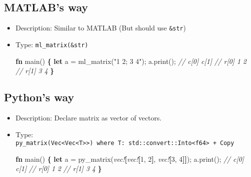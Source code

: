 \documentclass[]{book}
\newenvironment{Shaded}{\begin{snugshade}}{\end{snugshade}}
\newcommand{\CommentTok}[1]{\textcolor[rgb]{0.56,0.35,0.01}{\textit{#1}}}
\newcommand{\DecValTok}[1]{\textcolor[rgb]{0.00,0.00,0.81}{#1}}
\newcommand{\KeywordTok}[1]{\textcolor[rgb]{0.13,0.29,0.53}{\textbf{#1}}}
\newcommand{\NormalTok}[1]{#1}
\newcommand{\OperatorTok}[1]{\textcolor[rgb]{0.81,0.36,0.00}{\textbf{#1}}}
\newcommand{\PreprocessorTok}[1]{\textcolor[rgb]{0.56,0.35,0.01}{\textit{#1}}}
\newcommand{\StringTok}[1]{\textcolor[rgb]{0.31,0.60,0.02}{#1}}
\begin{document}
\hypertarget{matlabs-way}{%
\subsection{MATLAB's way}\label{matlabs-way}}

\begin{itemize}
\item
  Description: Similar to MATLAB (But should use \texttt{\&str})
\item
  Type: \texttt{ml\_matrix(\&str)}

\begin{Shaded}
\begin{Highlighting}[]
\KeywordTok{fn}\NormalTok{ main() }\OperatorTok{\{}
    \KeywordTok{let}\NormalTok{ a = ml_matrix(}\StringTok{"1 2; 3 4"}\NormalTok{);}
\NormalTok{    a.print();}
    \CommentTok{//       c[0] c[1]}
    \CommentTok{// r[0]     1    2}
    \CommentTok{// r[1]     3    4}
\OperatorTok{\}}
\end{Highlighting}
\end{Shaded}
\end{itemize}

\hypertarget{pythons-way}{%
\subsection{Python's way}\label{pythons-way}}

\begin{itemize}
\item
  Description: Declare matrix as vector of vectors.
\item
  Type: \texttt{py\_matrix(Vec\textless{}Vec\textless{}T\textgreater{}\textgreater{})\ where\ T:\ std::convert::Into\textless{}f64\textgreater{}\ +\ Copy}

\begin{Shaded}
\begin{Highlighting}[]
\KeywordTok{fn}\NormalTok{ main() }\OperatorTok{\{}
    \KeywordTok{let}\NormalTok{ a = py_matrix(}\PreprocessorTok{vec!}\OperatorTok{[}\PreprocessorTok{vec!}\OperatorTok{[}\DecValTok{1}\NormalTok{, }\DecValTok{2}\OperatorTok{]}\NormalTok{, }\PreprocessorTok{vec!}\OperatorTok{[}\DecValTok{3}\NormalTok{, }\DecValTok{4}\OperatorTok{]]}\NormalTok{);}
\NormalTok{    a.print();}
    \CommentTok{//       c[0] c[1]}
    \CommentTok{// r[0]     1    2}
    \CommentTok{// r[1]     3    4}
\OperatorTok{\}}
\end{Highlighting}
\end{Shaded}
\end{itemize}
\end{document}
